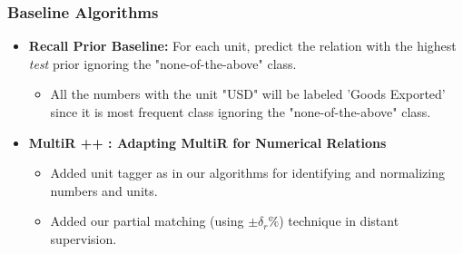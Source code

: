 \documentclass{beamer}
\begin{document}

\begin{frame}
\frametitle{Baseline Algorithms}
\begin{itemize}
\setlength\itemsep{2em}
\item \textbf{Recall \textendash Prior Baseline: } For each unit, predict the relation with the highest \emph{test} prior ignoring the "none-of-the-above" class.
\begin{itemize}
	\item All the numbers with the unit "USD" will be labeled 'Goods Exported' since it is most frequent class ignoring the "none-of-the-above" class. \pause
\end{itemize}


\item \textbf{MultiR ++ : Adapting MultiR for Numerical Relations}
\begin{itemize}
\item Added unit tagger as in our algorithms for identifying and normalizing numbers and units.
\item Added our partial matching (using $\pm \delta_r\%$) technique in distant supervision.
\end{itemize}
\end{itemize}
\end{frame}
\end{document}
